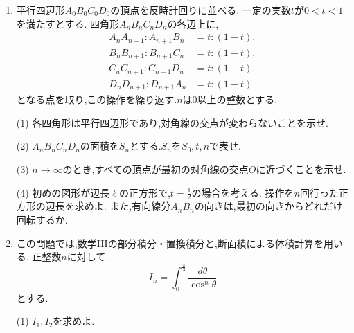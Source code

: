 \begin{enumerate}[label=\textbf{問\arabic*.},leftmargin=3.8em,format=\bookitemlink{practice-entrance}{problem}{hint}]
    \smallskip
    \noindent (1)~$c_n$を階乗を用いて表せ.ただし,$0!=1$とする.

    \smallskip
    \noindent (2)~正整数$n$に対し,
    \[
      nT_n=\sum_{j=0}^{n-1}(2j+1)c_jc_{n-1-j}
    \]
    を示せ.さらに,この等式を用いて$T_n$を求めよ.

    \smallskip
    \noindent (3)~正整数$n$に対し,
    \[
      \sum_{k=0}^{n}\binom{2k}{k}
      \binom{2n-2k}{n-k}=4^n
    \]
    が成り立つことを示せ.
    \par{}
  \item 平行四辺形$A_0B_0C_0D_0$の頂点を反時計回りに並べる.
    一定の実数$t$が$0<t<1$を満たすとする.
    四角形$A_nB_nC_nD_n$の各辺上に,
    \[
      \begin{aligned}
        A_nA_{n+1}:A_{n+1}B_n&=t:(1-t),\\
        B_nB_{n+1}:B_{n+1}C_n&=t:(1-t),\\
        C_nC_{n+1}:C_{n+1}D_n&=t:(1-t),\\
        D_nD_{n+1}:D_{n+1}A_n&=t:(1-t)
      \end{aligned}
    \]
    となる点を取り,この操作を繰り返す.$n$は$0$以上の整数とする.
    \par\noindent
    (1) 各四角形は平行四辺形であり,対角線の交点が変わらないことを示せ.
    \par\noindent
    (2) $A_nB_nC_nD_n$の面積を$S_n$とする.$S_n$を$S_0,t,n$で表せ.
    \par\noindent
    (3) $n\to\infty$のとき,すべての頂点が最初の対角線の交点$O$に近づくことを示せ.
    \par\noindent
    (4) 初めの図形が辺長$\ell$の正方形で,$t=\frac{1}{2}$の場合を考える.
    操作を$n$回行った正方形の辺長を求めよ.
    また,有向線分$A_nB_n$の向きは,最初の向きからどれだけ回転するか.
    \par{}
  \item この問題では,数学IIIの部分積分・置換積分と,断面積による体積計算を用いる.
    正整数$n$に対して,
    \[
      I_n=\int_0^{\frac{\pi}{3}}\frac{d\theta}{\cos^n\theta}
    \]
    とする.
    \par\noindent
    (1) $I_1,I_2$を求めよ.
    \par\noindent

\end{enumerate}
